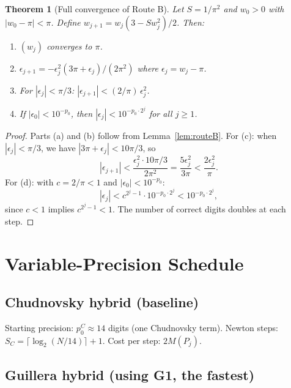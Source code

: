 \documentclass[11pt]{article}
\newtheorem{theorem}{Theorem}[section]
\begin{document}
\begin{theorem}[Full convergence of Route B]\label{thm:routeB-precise}
Let $S = 1/\pi^2$ and $w_0 > 0$ with $|w_0 - \pi| < \pi$. Define $w_{j+1} = w_j(3 - Sw_j^2)/2$. Then:
\begin{enumerate}
\item[(a)] $(w_j)$ converges to $\pi$.
\item[(b)] $\epsilon_{j+1} = -\epsilon_j^2(3\pi + \epsilon_j)/(2\pi^2)$ where $\epsilon_j = w_j - \pi$.
\item[(c)] For $|\epsilon_j| < \pi/3$: $|\epsilon_{j+1}| < (2/\pi)\,\epsilon_j^2$.
\item[(d)] If $|\epsilon_0| < 10^{-p_0}$, then $|\epsilon_j| < 10^{-p_0 \cdot 2^j}$ for all $j \geq 1$.
\end{enumerate}
\end{theorem}

\begin{proof}
Parts (a) and (b) follow from Lemma~\ref{lem:routeB}. For (c): when $|\epsilon_j| < \pi/3$, we have $|3\pi + \epsilon_j| < 10\pi/3$, so
\[
|\epsilon_{j+1}| < \frac{\epsilon_j^2 \cdot 10\pi/3}{2\pi^2} = \frac{5\epsilon_j^2}{3\pi} < \frac{2\epsilon_j^2}{\pi}.
\]
For (d): with $c = 2/\pi < 1$ and $|\epsilon_0| < 10^{-p_0}$:
\[
|\epsilon_j| < c^{2^j - 1} \cdot 10^{-p_0 \cdot 2^j} < 10^{-p_0 \cdot 2^j},
\]
since $c < 1$ implies $c^{2^j - 1} < 1$. The number of correct digits doubles at each step. \qedhere
\end{proof}

\section{Variable-Precision Schedule}
\label{sec:schedule}

\subsection{Chudnovsky hybrid (baseline)}

Starting precision: $p_0^C \approx 14$ digits (one Chudnovsky term). Newton steps: $S_C = \lceil \log_2(N/14) \rceil + 1$. Cost per step: $2M(P_j)$.

\subsection{Guillera hybrid (using G1, the fastest)}
\end{document}
